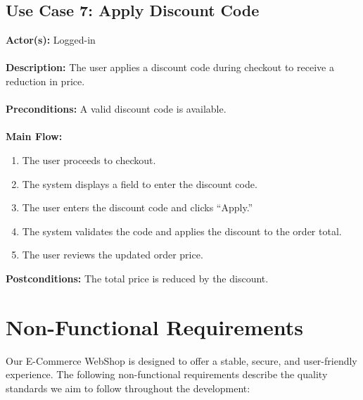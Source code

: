 \documentclass[a4paper,12pt]{article}
\begin{document}
	\subsection*{Use Case 7: Apply Discount Code}
	\textbf{Actor(s):} Logged-in \\ \\
	\textbf{Description:} The user applies a discount code during checkout to receive a \\ reduction in
	price. \\ \\
	\textbf{Preconditions:} A valid discount code is available. \\ \\
	\textbf{Main Flow:}
	\begin{enumerate}
  		\item The user proceeds to checkout.
  		\item The system displays a field to enter the discount code.
  		\item The user enters the discount code and clicks ``Apply.''
  		\item The system validates the code and applies the discount to the order total.
  		\item The user reviews the updated order price.
	\end{enumerate}
	\textbf{Postconditions:} The total price is reduced by the discount.

	
	\section{Non-Functional Requirements}

Our E-Commerce WebShop is designed to offer a stable, secure, and user-friendly experience. The following non-functional requirements describe the quality standards we aim to follow throughout the development:
\end{document}
